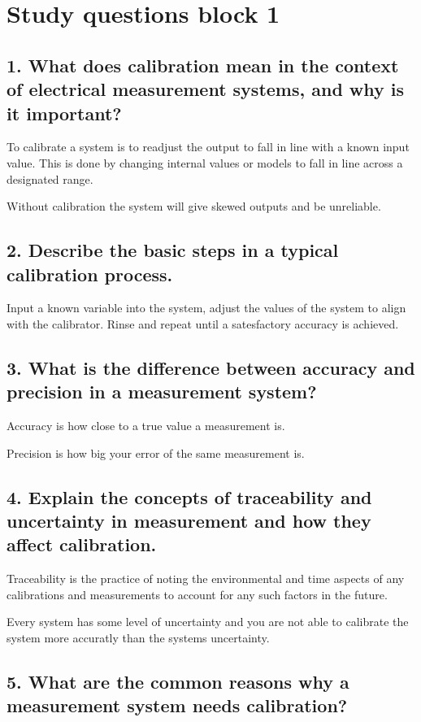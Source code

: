 \section{Study questions block 1}
\subsection{\textbf{1. What does calibration mean in the context of electrical measurement systems, and why is it important?}}
To calibrate a system is to readjust the output to fall in line with a known input value. This is done by changing internal values or models to fall in line across a designated range. 

Without calibration the system will give skewed outputs and be unreliable. 

\subsection{\textbf{2. Describe the basic steps in a typical calibration process.}}
Input a known variable into the system, adjust the values of the system to align with the calibrator. Rinse and repeat until a satesfactory accuracy is achieved.

\subsection{\textbf{3. What is the difference between accuracy and precision in a measurement system?}}
Accuracy is how close to a true value a measurement is.

Precision is how big your error of the same measurement is.
\subsection{\textbf{4. Explain the concepts of traceability and uncertainty in measurement and how they affect calibration.}}
Traceability is the practice of noting the environmental and time aspects of any calibrations and measurements to account for any such factors in the future. 

Every system has some level of uncertainty and you are not able to calibrate the system more accuratly than the systems uncertainty. 

\subsection{\textbf{5. What are the common reasons why a measurement system needs calibration?}}

